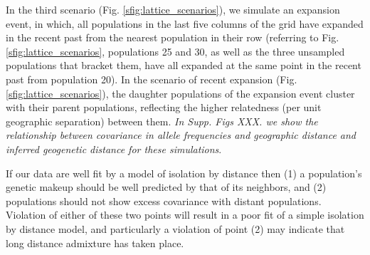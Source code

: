 \documentclass[12pt]{article}
\newcommand{\gc}[1]{{\em \color{blue} #1}}
\begin{document}
In the third scenario (Fig. \ref{sfig:lattice_scenarios}), we simulate an expansion event, in which, all populations in the last five columns of the grid have expanded in the recent past from the nearest population in their row (referring to Fig. \ref{sfig:lattice_scenarios}, populations 25 and 30, as well as the three unsampled populations that bracket them, have all expanded at the same point in the recent past from population 20). In the scenario of recent expansion (Fig. \ref{sfig:lattice_scenarios}), the daughter populations of the expansion event cluster with their parent populations, reflecting the higher relatedness (per unit geographic separation) between them.  \gc{In Supp. Figs XXX. we show the relationship between covariance in allele frequencies and geographic distance and inferred geogenetic distance for these simulations}.

If our data are well fit by a model of isolation by distance then (1) a population's genetic makeup should be well predicted by that of its neighbors, and (2) populations should not show excess covariance with distant populations. Violation of either of these two points will result in a poor fit of a simple isolation by distance model, and particularly a violation of point (2) may indicate that long distance admixture has taken place.
\end{document}
